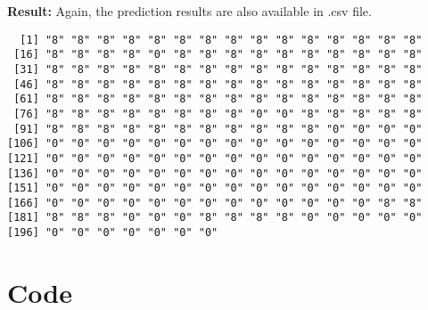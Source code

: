 \documentclass{article}
\begin{document}
\textbf{Result:}
Again, the prediction results are also available in .csv file. 
\begin{verbatim}
  [1] "8" "8" "8" "8" "8" "8" "8" "8" "8" "8" "8" "8" "8" "8" "8"
 [16] "8" "8" "8" "8" "0" "8" "8" "8" "8" "8" "8" "8" "8" "8" "8"
 [31] "8" "8" "8" "8" "8" "8" "8" "8" "8" "8" "8" "8" "8" "8" "8"
 [46] "8" "8" "8" "8" "8" "8" "8" "8" "8" "8" "8" "8" "8" "8" "8"
 [61] "8" "8" "8" "8" "8" "8" "8" "8" "8" "8" "8" "8" "8" "8" "8"
 [76] "8" "8" "8" "8" "8" "8" "8" "8" "0" "0" "8" "8" "8" "8" "8"
 [91] "8" "8" "8" "8" "8" "8" "8" "8" "8" "8" "8" "0" "0" "0" "0"
[106] "0" "0" "0" "0" "0" "0" "0" "0" "0" "0" "0" "0" "0" "0" "0"
[121] "0" "0" "0" "0" "0" "0" "0" "0" "0" "0" "0" "0" "0" "0" "0"
[136] "0" "0" "0" "0" "0" "0" "0" "0" "0" "0" "0" "0" "0" "0" "0"
[151] "0" "0" "0" "0" "0" "0" "0" "0" "0" "0" "0" "0" "0" "0" "0"
[166] "0" "0" "0" "0" "0" "0" "0" "0" "0" "0" "0" "0" "0" "8" "8"
[181] "8" "8" "8" "0" "0" "0" "8" "8" "8" "8" "0" "0" "0" "0" "0"
[196] "0" "0" "0" "0" "0" "0" "0"

\end{verbatim}

\section{Code}
\end{document}
